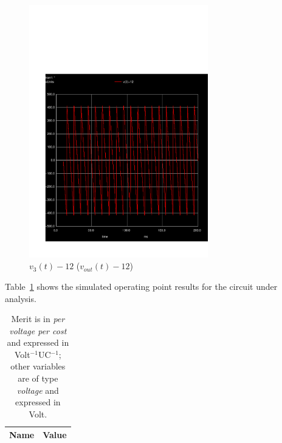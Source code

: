 \begin{figure}[h] \centering
\vspace{-3cm}
\includegraphics[height=11cm]{../sim/trans5.pdf}
\caption{$v_{3}(t)-12$ ($v_{out}(t)-12$)}
\label{fig:SIM_OUT-12}
\end{figure}

\newpage

Table~\ref{tab:SIM_RESULTADOS} shows the simulated operating point results for the circuit under analysis.
\begin{table}[h]
  \centering
  \begin{tabular}{|l|r|}
    \hline    
    {\bf Name} & {\bf Value} \\ \hline
    
  \end{tabular}
  \caption{Merit is in {\it per voltage per cost} and expressed in Volt$^{-1}$UC$^{-1}$; other variables are of type {\it voltage} and expressed in Volt.}
  \label{tab:SIM_RESULTADOS}
\end{table}



